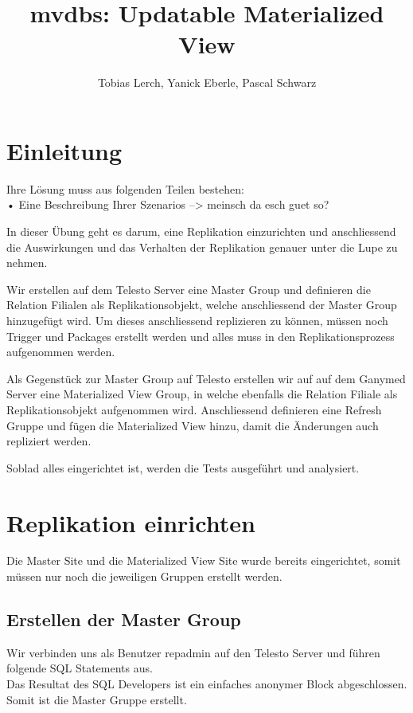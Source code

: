 \documentclass[11pt,a4paper,parskip=half]{scrartcl}
\title{mvdbs: Updatable Materialized View}
\author{Tobias Lerch, Yanick Eberle, Pascal Schwarz}
\begin{document}
\maketitle

\section{Einleitung}
Ihre Lösung muss aus folgenden Teilen bestehen:\\
• Eine Beschreibung Ihrer Szenarios --> meinsch da esch guet so?

In dieser Übung geht es darum, eine Replikation einzurichten und anschliessend die Auswirkungen und das Verhalten der Replikation genauer unter die Lupe zu nehmen.

Wir erstellen auf dem Telesto Server eine Master Group und definieren die Relation Filialen als Replikationsobjekt, welche anschliessend der Master Group hinzugefügt wird. Um dieses anschliessend replizieren zu können, müssen noch Trigger und Packages erstellt werden und alles muss in den Replikationsprozess aufgenommen werden.

Als Gegenstück zur Master Group auf Telesto erstellen wir auf auf dem Ganymed Server eine Materialized View Group, in welche ebenfalls die Relation Filiale als Replikationsobjekt aufgenommen wird. Anschliessend definieren eine Refresh Gruppe und fügen die Materialized View hinzu,  damit die Änderungen auch repliziert werden.

Soblad alles eingerichtet ist, werden die Tests ausgeführt und analysiert.

\section{Replikation einrichten}
Die Master Site und die Materialized View Site wurde bereits eingerichtet, somit müssen nur noch die jeweiligen Gruppen erstellt werden.
\subsection{Erstellen der Master Group}
Wir verbinden uns als Benutzer repadmin auf den Telesto Server und führen folgende SQL Statements aus.\\

 
Das Resultat des SQL Developers ist ein einfaches  \glqq anonymer Block abgeschlossen\grqq. Somit ist die Master Gruppe erstellt.\\
\end{document}
